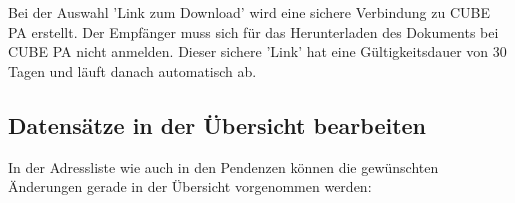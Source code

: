 \begin{figure}[H]
\end{figure}

Bei der Auswahl 'Link zum Download' wird eine sichere Verbindung zu CUBE PA erstellt. Der Empfänger muss sich für das Herunterladen des Dokuments bei CUBE PA nicht anmelden. Dieser sichere 'Link' hat eine Gültigkeitsdauer von 30 Tagen und läuft danach automatisch ab.

\subsection{Datensätze in der Übersicht bearbeiten}
In der Adressliste wie auch in den Pendenzen können die gewünschten Änderungen gerade in der Übersicht vorgenommen werden:

\begin{figure}[H]
\end{figure}

